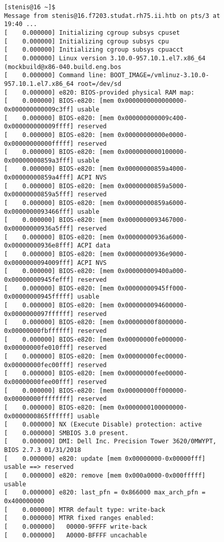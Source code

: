 \documentclass[a4paper]{article}
\begin{document}
\begin{figure}
\begin{verbatim}
[stenis@16 ~]$ 
Message from stenis@16.f7203.studat.rh75.ii.htb on pts/3 at 19:40 ...
[    0.000000] Initializing cgroup subsys cpuset
[    0.000000] Initializing cgroup subsys cpu
[    0.000000] Initializing cgroup subsys cpuacct
[    0.000000] Linux version 3.10.0-957.10.1.el7.x86_64 (mockbuild@x86-040.build.eng.bos
[    0.000000] Command line: BOOT_IMAGE=/vmlinuz-3.10.0-957.10.1.el7.x86_64 root=/dev/sd
[    0.000000] e820: BIOS-provided physical RAM map:
[    0.000000] BIOS-e820: [mem 0x0000000000000000-0x000000000009c3ff] usable
[    0.000000] BIOS-e820: [mem 0x000000000009c400-0x000000000009ffff] reserved
[    0.000000] BIOS-e820: [mem 0x00000000000e0000-0x00000000000fffff] reserved
[    0.000000] BIOS-e820: [mem 0x0000000000100000-0x00000000859a3fff] usable
[    0.000000] BIOS-e820: [mem 0x00000000859a4000-0x00000000859a4fff] ACPI NVS
[    0.000000] BIOS-e820: [mem 0x00000000859a5000-0x00000000859a5fff] reserved
[    0.000000] BIOS-e820: [mem 0x00000000859a6000-0x0000000093466fff] usable
[    0.000000] BIOS-e820: [mem 0x0000000093467000-0x00000000936a5fff] reserved
[    0.000000] BIOS-e820: [mem 0x00000000936a6000-0x00000000936e8fff] ACPI data
[    0.000000] BIOS-e820: [mem 0x00000000936e9000-0x0000000094009fff] ACPI NVS
[    0.000000] BIOS-e820: [mem 0x000000009400a000-0x00000000945fefff] reserved
[    0.000000] BIOS-e820: [mem 0x00000000945ff000-0x00000000945fffff] usable
[    0.000000] BIOS-e820: [mem 0x0000000094600000-0x0000000097ffffff] reserved
[    0.000000] BIOS-e820: [mem 0x00000000f8000000-0x00000000fbffffff] reserved
[    0.000000] BIOS-e820: [mem 0x00000000fe000000-0x00000000fe010fff] reserved
[    0.000000] BIOS-e820: [mem 0x00000000fec00000-0x00000000fec00fff] reserved
[    0.000000] BIOS-e820: [mem 0x00000000fee00000-0x00000000fee00fff] reserved
[    0.000000] BIOS-e820: [mem 0x00000000ff000000-0x00000000ffffffff] reserved
[    0.000000] BIOS-e820: [mem 0x0000000100000000-0x0000000865ffffff] usable
[    0.000000] NX (Execute Disable) protection: active
[    0.000000] SMBIOS 3.0 present.
[    0.000000] DMI: Dell Inc. Precision Tower 3620/0MWYPT, BIOS 2.7.3 01/31/2018
[    0.000000] e820: update [mem 0x00000000-0x00000fff] usable ==> reserved
[    0.000000] e820: remove [mem 0x000a0000-0x000fffff] usable
[    0.000000] e820: last_pfn = 0x866000 max_arch_pfn = 0x400000000
[    0.000000] MTRR default type: write-back
[    0.000000] MTRR fixed ranges enabled:
[    0.000000]   00000-9FFFF write-back
[    0.000000]   A0000-BFFFF uncachable

\end{verbatim}
\end{figure}
\end{document}
